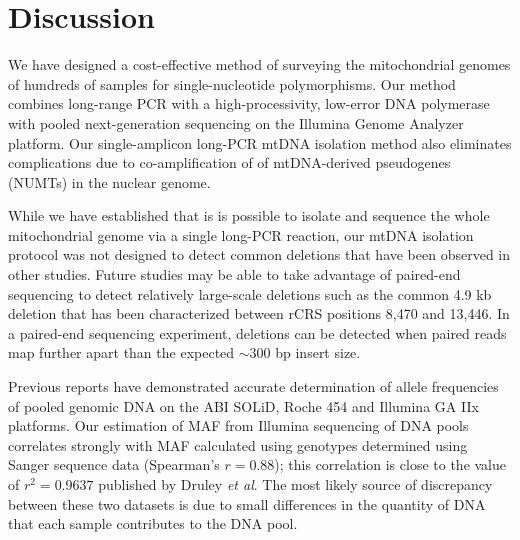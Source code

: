 \chapter{Discussion}\label{disc}

We have designed a cost-effective method of surveying the mitochondrial genomes of hundreds of samples for single-nucleotide polymorphisms.  Our method combines long-range PCR with a high-processivity, low-error DNA polymerase with pooled next-generation sequencing on the Illumina Genome Analyzer platform.  Our single-amplicon long-PCR mtDNA isolation method also eliminates complications due to co-amplification of of mtDNA-derived pseudogenes (NUMTs) in the nuclear genome.

While we have established that is is possible to isolate and sequence the whole mitochondrial genome via a single  long-PCR reaction, our mtDNA isolation protocol was not designed to detect common deletions that have been observed in other studies\cite{cortopassi1992pattern}.  Future studies may be able to take advantage of paired-end sequencing to detect relatively large-scale deletions such as the common 4.9 \ac{kb} deletion that has been characterized between \ac{rCRS} positions 8,470 and 13,446\cite{meissner20084977bp}.  In a paired-end sequencing experiment, deletions can be detected when paired reads map further apart than the expected $\sim 300$ bp insert size\cite{hajirasouliha2010detection}.

Previous reports have demonstrated accurate determination of allele frequencies of pooled genomic DNA on the ABI SOLiD, Roche 454 and Illumina GA IIx platforms\cite{druley2009quantification,Wei2011}.  Our estimation of MAF from Illumina sequencing of DNA pools correlates strongly with MAF calculated using genotypes determined using Sanger sequence data (Spearman's $r = 0.88$); this correlation is close to the value of $r^{2} = 0.9637$ published by Druley \textit{et al}\cite{druley2009quantification}.  The most likely source of discrepancy between these two datasets is due to small differences in the quantity of DNA that each sample contributes to the DNA pool.

